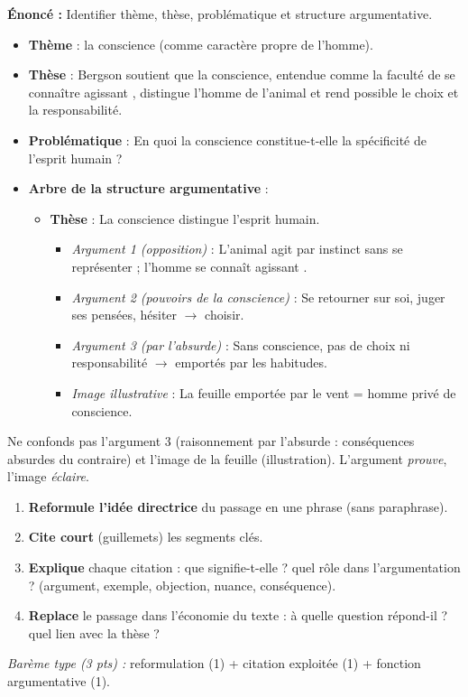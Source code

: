 \documentclass[11pt]{article}
\newcounter{popsec}
\newcounter{popsub}
\newcommand{\courssub}[1]{%
  \stepcounter{popsub}%
  \par\vspace{9pt}\noindent{\popxbold\fontsize{11.5}{13}\selectfont\color{popink}{\color{poporange}\thepopsec.\thepopsub}\hspace{6pt}#1}\par\nopagebreak\vspace{4pt}
}
\begin{document}
\begin{exoresolu}
\textbf{Énoncé :} Identifier thème, thèse, problématique et structure argumentative.
\tcblower
\begin{itemize}
\item \textbf{Thème} : la conscience (comme caractère propre de l'homme).
\item \textbf{Thèse} : Bergson soutient que la conscience, entendue comme la faculté de \og se connaître agissant \fg, distingue l'homme de l'animal et rend possible le choix et la responsabilité.
\item \textbf{Problématique} : En quoi la conscience constitue-t-elle la spécificité de l'esprit humain ?
\item \textbf{Arbre de la structure argumentative} :
\begin{itemize}
\item \textbf{Thèse} : La conscience distingue l'esprit humain.
\begin{itemize}
\item \emph{Argument 1 (opposition)} : L'animal agit par instinct sans se représenter ; l'homme \og se connaît agissant \fg.
\item \emph{Argument 2 (pouvoirs de la conscience)} : Se retourner sur soi, juger ses pensées, hésiter $\rightarrow$ choisir.
\item \emph{Argument 3 (par l'absurde)} : Sans conscience, pas de choix ni responsabilité $\rightarrow$ emportés par les habitudes.
\item \emph{Image illustrative} : La feuille emportée par le vent = homme privé de conscience.
\end{itemize}
\end{itemize}
\end{itemize}
\begin{attention}[Vigilance]
Ne confonds pas l'argument 3 (raisonnement par l'absurde : conséquences absurdes du contraire) et l'image de la feuille (illustration). L'argument \emph{prouve}, l'image \emph{éclaire}.
\end{attention}
\end{exoresolu}

\courssub{Les réponses aux questions}

\begin{methode}
\begin{enumerate}
\item \textbf{Reformule l'idée directrice} du passage en une phrase (sans paraphrase).
\item \textbf{Cite court} (guillemets) les segments clés.
\item \textbf{Explique} chaque citation : que signifie-t-elle ? quel rôle dans l'argumentation ? (argument, exemple, objection, nuance, conséquence).
\item \textbf{Replace} le passage dans l'économie du texte : à quelle question répond-il ? quel lien avec la thèse ?
\end{enumerate}
\emph{Barème type (3 pts) :} reformulation (1) + citation exploitée (1) + fonction argumentative (1).
\end{methode}
\end{document}
